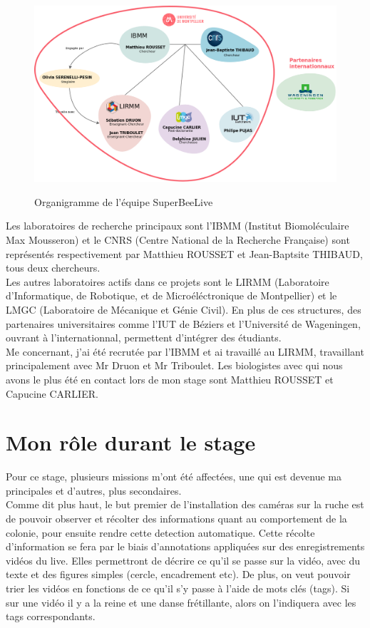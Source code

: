 \documentclass[11pt,french,a4paper]{report}
\begin{document}
\begin{figure}[!h]
\centering
\includegraphics[scale=0.3]{../images/dia/organiramme_equipe_projet.png} \\
\caption{Organigramme de l'équipe SuperBeeLive}
\label{orga_sbl}
\end{figure}

Les laboratoires de recherche principaux sont l'IBMM (Institut Biomoléculaire Max Mousseron) 
et le CNRS (Centre National de la Recherche Française) sont représentés respectivement par Matthieu ROUSSET et Jean-Baptsite THIBAUD, 
tous deux chercheurs. \\
Les autres laboratoires actifs dans ce projets sont le LIRMM (Laboratoire d'Informatique, de Robotique, 
et de Microéléctronique de Montpellier) et le LMGC (Laboratoire de Mécanique et Génie Civil). En plus de ces structures, 
des partenaires universitaires comme l'IUT de Béziers et l'Université de Wageningen, ouvrant à l'internationnal,
permettent d'intégrer des étudiants. \\
Me concernant, j'ai été recrutée par l'IBMM et ai travaillé au LIRMM, travaillant principalement avec Mr Druon et 
Mr Triboulet. Les biologistes avec qui nous avons le plus été en contact lors de mon stage sont Matthieu ROUSSET et Capucine CARLIER. \\


\section{Mon rôle durant le stage}
Pour ce stage, plusieurs missions m'ont été affectées, une qui est devenue ma principales et d'autres, plus secondaires.\\

Comme dit plus haut, le but premier de l'installation des caméras sur la ruche est de pouvoir observer et récolter des informations
quant au comportement de la colonie, pour ensuite rendre cette detection automatique. Cette récolte d'information se fera par le 
biais d'annotations appliquées sur des enregistrements vidéos du live. Elles permettront de décrire ce qu'il se passe sur la vidéo, 
avec du texte et des figures simples (cercle, encadrement etc).
De plus, on veut pouvoir trier les vidéos en fonctions de ce qu'il s'y passe à l'aide de mots clés (tags). 
Si sur une vidéo il y a la reine et une danse frétillante, alors on l'indiquera avec les tags correspondants. \\
\end{document}
